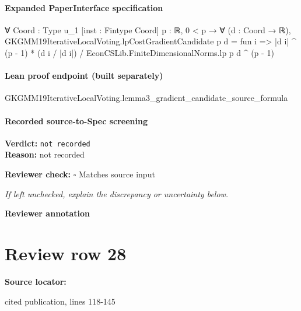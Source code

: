 \documentclass[10pt]{article}
\newcommand{\reviewerbox}{%
  \par\noindent\fbox{\parbox{0.96\linewidth}{\rule{0pt}{0.38in}}}\par
}
\newcommand{\reviewmatch}[1]{%
  \par\noindent\textbf{Reviewer check:} $\square$\; #1\par
  \noindent\emph{If left unchecked, explain the discrepancy or uncertainty below.}\par
}
\begin{document}
\paragraph{Expanded PaperInterface specification}
\begin{ReviewVerbatim}
∀ {Coord : Type u_1} [inst : Fintype Coord] {p : ℝ},
  0 < p →
    ∀ (d : Coord → ℝ),
      GKGMM19IterativeLocalVoting.lpCostGradientCandidate p d = fun i =>
        |d i| ^ (p - 1) * (d i / |d i|) / EconCSLib.FiniteDimensionalNorms.lp p d ^ (p - 1)
\end{ReviewVerbatim}

\paragraph{Lean proof endpoint (built separately)}\begin{ReviewVerbatim}
GKGMM19IterativeLocalVoting.lemma3_gradient_candidate_source_formula
\end{ReviewVerbatim}

\paragraph{Recorded source-to-Spec screening}
\textbf{Verdict:} \texttt{not recorded}
\\
\textbf{Reason:} not recorded
\reviewmatch{Matches source input}
\noindent\textbf{Reviewer annotation}\par
\reviewerbox
\clearpage
\hypertarget{source-claim-7c06ca676934c014}{}
\section*{Review row 28}
\textbf{Source locator:} {\footnotesize\raggedright cited publication, lines 118-\allowbreak{}145\par}
\end{document}
